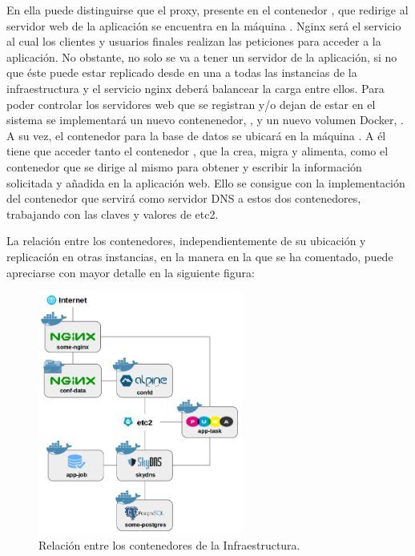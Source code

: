 En ella puede distinguirse que el proxy, presente en el contenedor , que redirige al servidor web de la aplicación se encuentra en la máquina . Nginx será el servicio al cual los clientes y usuarios finales realizan las peticiones para acceder a la aplicación. No obstante, no solo se va a tener un servidor de la aplicación, si no que éste puede estar replicado desde en una a todas las instancias de la infraestructura y el servicio nginx deberá balancear la carga entre ellos. Para poder controlar los servidores web que se registran y/o dejan de estar en el sistema se implementará un nuevo contenenedor, , y un nuevo volumen Docker, . A su vez, el contenedor  para la base de datos se ubicará en la máquina . A él tiene que acceder tanto el contenedor , que la crea, migra y alimenta, como el contenedor  que se dirige al mismo para obtener y escribir la información solicitada y añadida en la aplicación web. Ello se consigue con la implementación del contenedor  que servirá como servidor DNS a estos dos contenedores, trabajando con las claves y valores de etc2.

La relación entre los contenedores, independientemente de su ubicación y replicación en otras instancias, en la manera en la que se ha comentado, puede apreciarse con mayor detalle en la siguiente figura:

\begin{figure}[H]
\centering
\includegraphics[width=0.6\textwidth]{images/figures/aws-2-iteration.png}
\caption{Relación entre los contenedores de la Infraestructura.}
\end{figure}

